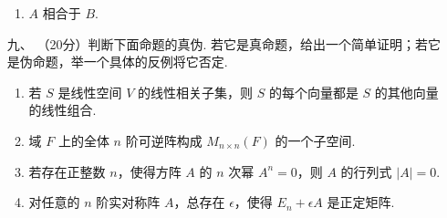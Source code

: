 \begin{enumerate}
\begin{enumerate}[label=(\arabic*)]
        \item $A$ 相合于 $B$.
    \end{enumerate}

\item [九、]（20分）判断下面命题的真伪. 若它是真命题，给出一个简单证明；若它是伪命题，举一个具体的反例将它否定.
    \begin{enumerate}[label=(\arabic*)]
        \item 若 $S$ 是线性空间 $V$ 的线性相关子集，则 $S$ 的每个向量都是 $S$ 的其他向量的线性组合.

        \item 域 $F$ 上的全体 $n$ 阶可逆阵构成 $M_{n\times n}(F)$ 的一个子空间.

        \item 若存在正整数 $n$，使得方阵 $A$ 的 $n$ 次幂 $A^n=0$，则 $A$ 的行列式 $\lvert A \rvert = 0$.

        \item 对任意的 $n$ 阶实对称阵 $A$，总存在 $\epsilon$，使得 $E_n+\epsilon A$ 是正定矩阵.
    \end{enumerate}
\end{enumerate}

\clearpage
